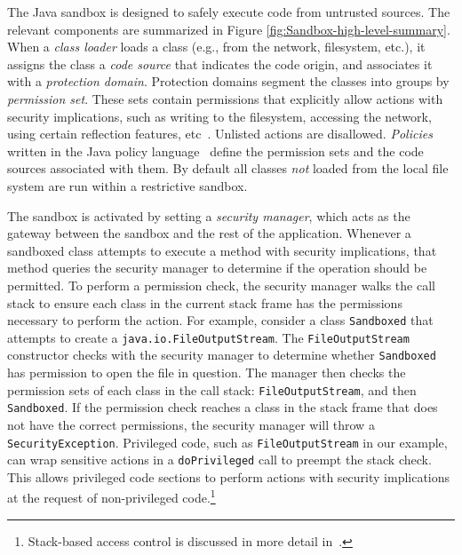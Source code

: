 \documentclass{sig-alternate}
\begin{document}
The Java sandbox is designed to safely execute code from untrusted
sources. 
The relevant components are summarized in Figure
\ref{fig:Sandbox-high-level-summary}. 
When a \textit{class loader} loads a class (e.g., from
the network, filesystem, etc.), it assigns the class a \textit{code source} that
indicates the code origin, and associates it with a \textit{protection
  domain}. Protection domains segment the classes into groups by
\textit{permission set}. These sets
contain permissions that explicitly allow actions with security
implications, such as writing to the filesystem, accessing the network, using
certain reflection features, etc~\cite{_permissions_2014}.  Unlisted actions are disallowed.
\emph{Policies} written in the Java policy
language~\cite{_java_policy_language} define the permission sets and the code
sources associated with them. 
By default all classes \emph{not} loaded from the local file system are run
within a restrictive sandbox. 

The sandbox is activated by setting a \emph{security manager}, which acts as the
gateway between the sandbox and the rest of the application. Whenever a
sandboxed class attempts to execute a method with security implications, that
method queries the security manager to determine if the operation should be
permitted. 
To perform a permission check, the security manager walks the call stack to
ensure each class in the current stack frame has the permissions necessary to
perform the action.  For example, consider a class \texttt{Sandboxed} that attempts
to create a \texttt{java.io.FileOutputStream}. The \texttt{FileOutputStream}
constructor checks with the security manager to determine whether
\texttt{Sandboxed} has permission to open the file in question.  The manager
then checks the permission sets of each class in the call stack:
\texttt{FileOutputStream}, and then \texttt{Sandboxed}.  If the permission check
reaches a class in the stack frame that does not have the correct permissions,
the security manager will throw a \texttt{SecurityException}.  Privileged code,
such as \texttt{FileOutputStream} in our example, can wrap sensitive actions in
a \texttt{doPrivileged} call to preempt the stack check.  This allows privileged
code sections to perform actions with security implications at the request of
non-privileged code.\footnote{Stack-based access control is discussed in more
  detail
  in~\cite{banerjee_stack-based_2005,besson_stack_2004,d._s._wallach_understanding_1998,erlingsson_irm_2000,fournet_stack_2002,pistoia_beyond_2007,zhao_type_2005}.}
\end{document}
